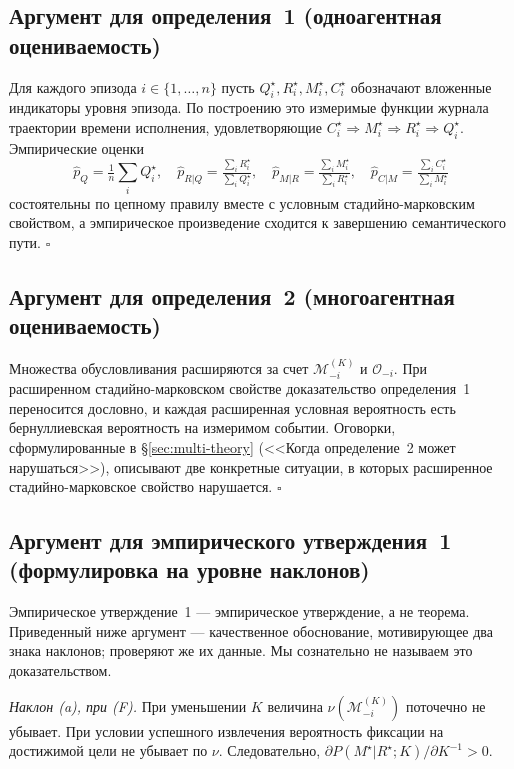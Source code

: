 \documentclass{article}
\begin{document}
\subsection{Аргумент для определения~1 (одноагентная оцениваемость)}

Для каждого эпизода $i \in \{1,\dots,n\}$ пусть $Q_i^\star, R_i^\star, M_i^\star, C_i^\star$ обозначают вложенные индикаторы уровня эпизода. По построению это измеримые функции журнала траектории времени исполнения, удовлетворяющие $C_i^\star \Rightarrow M_i^\star \Rightarrow R_i^\star \Rightarrow Q_i^\star$. Эмпирические оценки
\[
\hat p_Q = \tfrac{1}{n}\sum_i Q_i^\star,\quad
\hat p_{R|Q} = \tfrac{\sum_i R_i^\star}{\sum_i Q_i^\star},\quad
\hat p_{M|R} = \tfrac{\sum_i M_i^\star}{\sum_i R_i^\star},\quad
\hat p_{C|M} = \tfrac{\sum_i C_i^\star}{\sum_i M_i^\star}
\]
состоятельны по цепному правилу вместе с условным стадийно-марковским свойством, а эмпирическое произведение сходится к завершению семантического пути. \hfill$\square$

\subsection{Аргумент для определения~2 (многоагентная оцениваемость)}

Множества обусловливания расширяются за счет $\mathcal{M}_{-i}^{(K)}$ и $\mathcal{O}_{-i}$. При расширенном стадийно-марковском свойстве доказательство определения~1 переносится дословно, и каждая расширенная условная вероятность есть бернуллиевская вероятность на измеримом событии. Оговорки, сформулированные в \S\ref{sec:multi-theory} (<<Когда определение~2 может нарушаться>>), описывают две конкретные ситуации, в которых расширенное стадийно-марковское свойство нарушается. \hfill$\square$

\subsection{Аргумент для эмпирического утверждения~1 (формулировка на уровне наклонов)}

Эмпирическое утверждение~1 --- эмпирическое утверждение, а не теорема. Приведенный ниже аргумент --- качественное обоснование, мотивирующее два знака наклонов; проверяют же их данные. Мы сознательно не называем это доказательством.

\emph{Наклон (a), при (F).} При уменьшении $K$ величина $\nu(\mathcal{M}_{-i}^{(K)})$ поточечно не убывает. При условии успешного извлечения вероятность фиксации на достижимой цели не убывает по $\nu$. Следовательно, $\partial P(M^\star|R^\star;K) / \partial K^{-1} > 0$.
\end{document}
